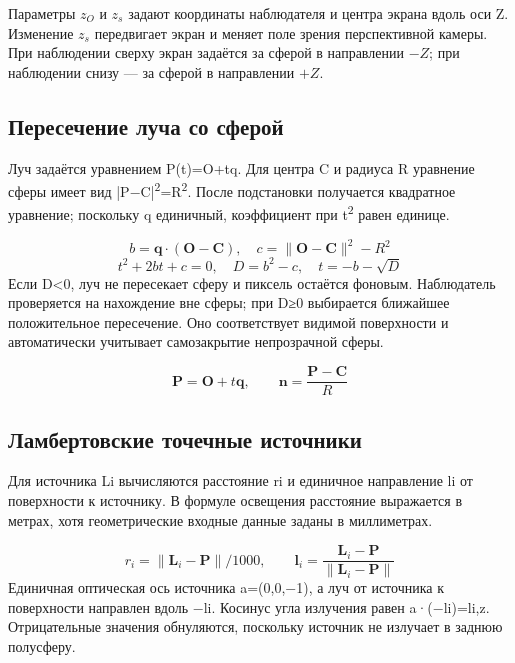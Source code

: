 \documentclass[a4paper,12pt]{article}
\begin{document}
Параметры $z_O$ и $z_s$ задают координаты наблюдателя и центра экрана вдоль оси Z. Изменение $z_s$ передвигает экран и меняет поле зрения перспективной камеры. При наблюдении сверху экран задаётся за сферой в направлении $-Z$; при наблюдении снизу — за сферой в направлении $+Z$.

\subsection{Пересечение луча со сферой}
Луч задаётся уравнением P(t)=O+tq. Для центра C и радиуса R уравнение сферы имеет вид |P\ensuremath{-}C|\textsuperscript{2}=R\textsuperscript{2}. После подстановки получается квадратное уравнение; поскольку q единичный, коэффициент при t\textsuperscript{2} равен единице.

\begin{equation}
b=\mathbf{q}\cdot(\mathbf{O}-\mathbf{C}),\quad c=\|\mathbf{O}-\mathbf{C}\|^2-R^2
\end{equation}
\begin{equation}
t^2+2bt+c=0,\quad D=b^2-c,\quad t=-b-\sqrt{D}
\end{equation}
Если D<0, луч не пересекает сферу и пиксель остаётся фоновым. Наблюдатель проверяется на нахождение вне сферы; при D≥0 выбирается ближайшее положительное пересечение. Оно соответствует видимой поверхности и автоматически учитывает самозакрытие непрозрачной сферы.

\begin{equation}
\mathbf{P}=\mathbf{O}+t\mathbf{q},\qquad \mathbf{n}=\frac{\mathbf{P}-\mathbf{C}}{R}
\end{equation}
\clearpage
\subsection{Ламбертовские точечные источники}
Для источника Li вычисляются расстояние ri и единичное направление li от поверхности к источнику. В формуле освещения расстояние выражается в метрах, хотя геометрические входные данные заданы в миллиметрах.

\begin{equation}
r_i=\|\mathbf{L}_i-\mathbf{P}\|/1000,\qquad \mathbf{l}_i=\frac{\mathbf{L}_i-\mathbf{P}}{\|\mathbf{L}_i-\mathbf{P}\|}
\end{equation}
Единичная оптическая ось источника a=(0,0,\ensuremath{-}1), а луч от источника к поверхности направлен вдоль \ensuremath{-}li. Косинус угла излучения равен a·(\ensuremath{-}li)=li,z. Отрицательные значения обнуляются, поскольку источник не излучает в заднюю полусферу.
\end{document}
